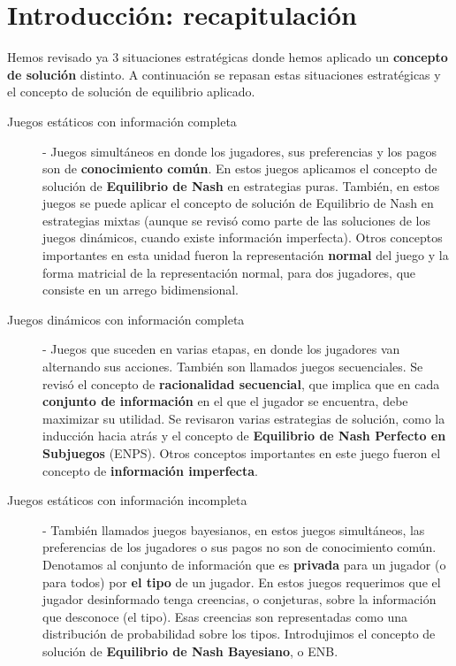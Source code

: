 \documentclass[12pt]{article}
\begin{document}
\section{Introducción: recapitulación}

Hemos revisado ya 3 situaciones estratégicas donde hemos aplicado un \textbf{concepto de solución} distinto. A continuación se repasan estas situaciones estratégicas y el concepto de solución de equilibrio aplicado.

\begin{summarybox}{}
	\begin{description}
		\item[Juegos {\color{blue!80} estáticos} con información completa] - Juegos simultáneos en donde los jugadores, sus preferencias y los pagos son de \textbf{conocimiento común}. En estos juegos aplicamos el concepto de solución de \textbf{Equilibrio de Nash} en estrategias puras. También, en estos juegos se puede aplicar el concepto de solución de Equilibrio de Nash en estrategias mixtas (aunque se revisó como parte de las soluciones de los juegos dinámicos, cuando existe información imperfecta). Otros conceptos importantes en esta unidad fueron la representación \textbf{normal} del juego y la forma matricial de la representación normal, para dos jugadores, que consiste en un arrego bidimensional.
			\item[Juegos {\color{blue!80}dinámicos} con información completa]- Juegos que suceden en varias etapas, en donde los jugadores van alternando sus acciones. También son llamados juegos secuenciales. Se revisó el concepto de \textbf{racionalidad secuencial}, que implica que en cada \textbf{conjunto de información} en el que el jugador se encuentra, debe maximizar su utilidad. Se revisaron varias estrategias de solución, como la inducción hacia atrás y el concepto de \textbf{Equilibrio de Nash Perfecto en Subjuegos} (ENPS). Otros conceptos importantes en este juego fueron el concepto de \textbf{información imperfecta}.
		\item[Juegos {\color{green!70!black} estáticos} con información {\color{red!70!black}incompleta}] - También llamados juegos bayesianos, en estos juegos simultáneos, las preferencias de los jugadores o sus pagos no son de conocimiento común. Denotamos al conjunto de información que es \textbf{privada} para un jugador (o para todos) por \textbf{el tipo} de un jugador. En estos juegos requerimos que el jugador desinformado tenga creencias, o conjeturas, sobre la información que desconoce (el tipo). Esas creencias son representadas como una distribución de probabilidad sobre los tipos. Introdujimos el concepto de solución de \textbf{Equilibrio de Nash Bayesiano}, o ENB.
	\end{description}
\end{summarybox}
\end{document}
